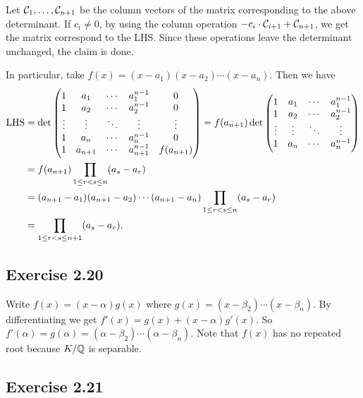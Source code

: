 \documentclass[../Marcus.tex]{subfiles}
\begin{document}
Let $\mathcal{C}_1,\ldots,\mathcal{C}_{n+1}$ be the column vectors of the matrix corresponding to the above determinant. If $c_i\neq 0$, by using the column operation $-c_i\cdot\mathcal{C}_{i+1}+\mathcal{C}_{n+1}$, we get the matrix correspond to the LHS. Since these operations leave the determinant unchanged, the claim is done.

In particular, take $f(x)=(x-a_1)(x-a_2)\cdots(x-a_n)$. Then we have
$$
\begin{aligned}
    \operatorname{LHS} &= \det\begin{pmatrix}
    1           & a_1        & \cdots & a_1^{n-1}        & 0 \\
    1           & a_2        & \cdots & a_2^{n-1}       & 0 \\
    \vdots & \vdots    & \ddots & \vdots              & \vdots \\
    1           & a_n        & \cdots & a_n^{n-1}        & 0 \\
    1           & a_{n+1} & \cdots & a_{n+1}^{n-1} & f(a_{n+1})
\end{pmatrix}
=
f(a_{n+1})
\det\begin{pmatrix}
    1           & a_1      & \cdots & a_1^{n-1} \\
    1           & a_2     & \cdots & a_2^{n-1} \\
    \vdots & \vdots & \ddots & \vdots \\
    1          & a_n      & \cdots & a_n^{n-1}
\end{pmatrix} \\
    &= f(a_{n+1})\prod_{1\leq r<s\leq n}(a_s-a_r) \\
    &= (a_{n+1}-a_1)(a_{n+1}-a_2)\cdots(a_{n+1}-a_n)\prod_{1\leq r<s\leq n}(a_s-a_r)  \\
    &= \prod_{1\leq r<s\leq n+1}(a_s-a_r).
\end{aligned}
$$

\subsection*{Exercise 2.20}

Write $f(x)=(x-\alpha)g(x)$ where $g(x)=(x-\beta_2)\cdots(x-\beta_n)$. By differentiating we get $f'(x)=g(x)+(x-\alpha)g'(x)$. So $f'(\alpha)=g(\alpha)=(\alpha-\beta_2)\cdots(\alpha-\beta_n)$. Note that $f(x)$ has no repeated root because $K/\mathbb{Q}$ is separable.

\subsection*{Exercise 2.21}
\end{document}
